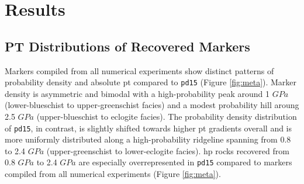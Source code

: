 \hypertarget{chpt4Results}{%
\section{Results}\label{chpt4Results}}

\hypertarget{pt-distributions-of-recovered-markers}{%
\subsection{PT Distributions of Recovered Markers}\label{pt-distributions-of-recovered-markers}}

Markers compiled from all numerical experiments show distinct patterns of probability density and absolute \gls{pt} compared to \texttt{pd15} (Figure \ref{fig:meta}). Marker density is asymmetric and bimodal with a high-probability peak around 1 \(GPa\) (lower-blueschist to upper-greenschist facies) and a modest probability hill aroung 2.5 \(GPa\) (upper-blueschist to eclogite facies). The probability density distribution of \texttt{pd15}, in contrast, is slightly shifted towards higher \gls{pt} gradients overall and is more uniformly distributed along a high-probability ridgeline spanning from 0.8 to 2.4 \(GPa\) (upper-greenschist to lower-eclogite facies). \gls{hp} rocks recovered from 0.8 \(GPa\) to 2.4 \(GPa\) are especially overrepresented in \texttt{pd15} compared to markers compiled from all numerical experiments (Figure \ref{fig:meta}).



